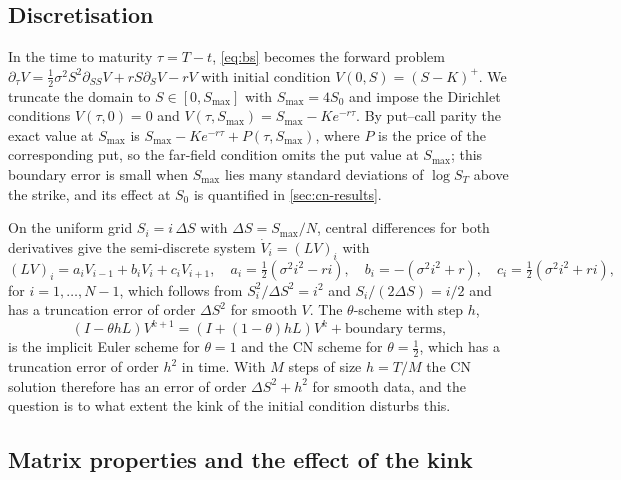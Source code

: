 \documentclass[11pt,a4paper]{article}
\begin{document}
\subsection{Discretisation}\label{sec:cn-disc}

In the time to maturity $\tau = T-t$, \cref{eq:bs} becomes the forward problem $\partial_\tau V = \frac12\sigma^2S^2\partial_{SS}V + rS\partial_S V - rV$ with initial condition $V(0,S)=(S-K)^+$.
We truncate the domain to $S\in[0,S_{\max}]$ with $S_{\max}=4S_0$ and impose the Dirichlet conditions $V(\tau,0)=0$ and $V(\tau,S_{\max}) = S_{\max} - Ke^{-r\tau}$.
By put--call parity the exact value at $S_{\max}$ is $S_{\max} - Ke^{-r\tau} + P(\tau,S_{\max})$, where $P$ is the price of the corresponding put, so the far-field condition omits the put value at $S_{\max}$; this boundary error is small when $S_{\max}$ lies many standard deviations of $\log S_T$ above the strike, and its effect at $S_0$ is quantified in \cref{sec:cn-results}.

On the uniform grid $S_i = i\,\Delta S$ with $\Delta S = S_{\max}/N$, central differences for both derivatives give the semi-discrete system $\dot V_i = (LV)_i$ with
\begin{equation}\label{eq:L}
(LV)_i = a_iV_{i-1} + b_iV_i + c_iV_{i+1},\quad a_i = \tfrac12(\sigma^2i^2 - ri),\quad b_i = -(\sigma^2i^2+r),\quad c_i = \tfrac12(\sigma^2i^2+ri),
\end{equation}
for $i=1,\dots,N-1$, which follows from $S_i^2/\Delta S^2 = i^2$ and $S_i/(2\Delta S) = i/2$ and has a truncation error of order $\Delta S^2$ for smooth $V$.
The $\theta$-scheme with step $h$,
\begin{equation}\label{eq:theta}
(I-\theta hL)V^{k+1} = (I+(1-\theta)hL)V^k + \text{boundary terms},
\end{equation}
is the implicit Euler scheme for $\theta=1$ and the CN scheme for $\theta=\frac12$, which has a truncation error of order $h^2$ in time.
With $M$ steps of size $h=T/M$ the CN solution therefore has an error of order $\Delta S^2 + h^2$ for smooth data, and the question is to what extent the kink of the initial condition disturbs this.

\subsection{Matrix properties and the effect of the kink}\label{sec:cn-stab}
\end{document}
